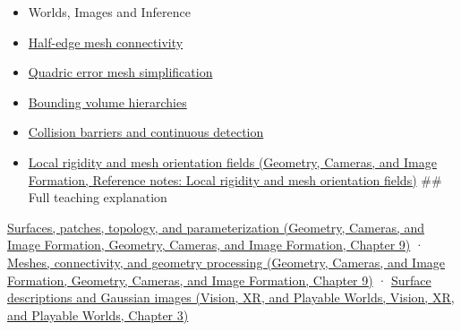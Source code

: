 \begin{itemize}
\item
  {Worlds, Images and Inference}
\item
  \hyperref[appendix-1aea26b2307f]{Half-edge mesh connectivity}
\item
  \hyperref[appendix-1dd4ad54ca57]{Quadric error mesh simplification}
\item
  \hyperref[appendix-0b426c47dd78]{Bounding volume hierarchies}
\item
  \hyperref[appendix-a9ba01fa72a6]{Collision barriers and continuous detection}
\item
  \href{../03-Geometry-Cameras-and-Image-Formation/main.pdf\#nameddest=appendix-7107009c505b}{Local rigidity and mesh orientation fields (Geometry, Cameras, and Image Formation, Reference notes: Local rigidity and mesh orientation fields)} \#\# Full teaching explanation
\end{itemize}

\href{../03-Geometry-Cameras-and-Image-Formation/main.pdf\#nameddest=03-visual-computing-i-ch002-surfaces-patches-topology-and-parameterization}{Surfaces, patches, topology, and parameterization (Geometry, Cameras, and Image Formation, Geometry, Cameras, and Image Formation, Chapter 9)} · \href{../03-Geometry-Cameras-and-Image-Formation/main.pdf\#nameddest=03-visual-computing-i-ch002-meshes-connectivity-and-geometry-processing}{Meshes, connectivity, and geometry processing (Geometry, Cameras, and Image Formation, Geometry, Cameras, and Image Formation, Chapter 9)} · \href{../07-Vision-XR-and-Playable-Worlds/main.pdf\#nameddest=04-visual-computing-ii-ch032-surface-descriptions-and-gaussian-images}{Surface descriptions and Gaussian images (Vision, XR, and Playable Worlds, Vision, XR, and Playable Worlds, Chapter 3)}
